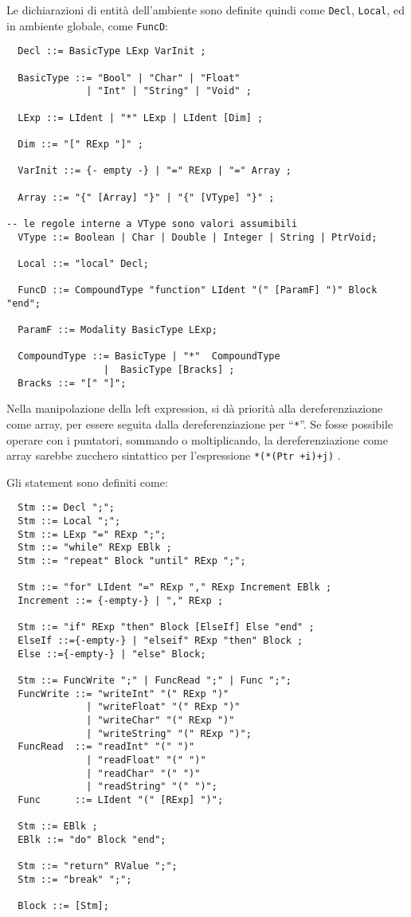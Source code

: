 \documentclass{article}
\begin{document}
Le dichiarazioni di entità dell'ambiente sono definite quindi come \texttt{Decl}, \texttt{Local}, ed in ambiente globale,
come \texttt{FuncD}:
\begin{verbatim}
  Decl ::= BasicType LExp VarInit ;

  BasicType ::= "Bool" | "Char" | "Float" 
              | "Int" | "String" | "Void" ;
  
  LExp ::= LIdent | "*" LExp | LIdent [Dim] ;

  Dim ::= "[" RExp "]" ;

  VarInit ::= {- empty -} | "=" RExp | "=" Array ;

  Array ::= "{" [Array] "}" | "{" [VType] "}" ;

-- le regole interne a VType sono valori assumibili
  VType ::= Boolean | Char | Double | Integer | String | PtrVoid;
  
  Local ::= "local" Decl;
  
  FuncD ::= CompoundType "function" LIdent "(" [ParamF] ")" Block "end";

  ParamF ::= Modality BasicType LExp;

  CompoundType ::= BasicType | "*"  CompoundType 
                 |  BasicType [Bracks] ;
  Bracks ::= "[" "]";
\end{verbatim}
Nella manipolazione della left expression, si dà priorità alla dereferenziazione come array, per essere
seguita dalla dereferenziazione per ``\texttt{*}''. Se fosse possibile operare con i puntatori, sommando
o moltiplicando, la dereferenziazione come array sarebbe zucchero sintattico per l'espressione \texttt{*(*(Ptr +i)+j)} .

Gli statement sono definiti come:
\begin{verbatim}
  Stm ::= Decl ";";
  Stm ::= Local ";";
  Stm ::= LExp "=" RExp ";";
  Stm ::= "while" RExp EBlk ;
  Stm ::= "repeat" Block "until" RExp ";";
  
  Stm ::= "for" LIdent "=" RExp "," RExp Increment EBlk ;
  Increment ::= {-empty-} | "," RExp ;
  
  Stm ::= "if" RExp "then" Block [ElseIf] Else "end" ;
  ElseIf ::={-empty-} | "elseif" RExp "then" Block ;
  Else ::={-empty-} | "else" Block;
  
  Stm ::= FuncWrite ";" | FuncRead ";" | Func ";";
  FuncWrite ::= "writeInt" "(" RExp ")"
              | "writeFloat" "(" RExp ")"
              | "writeChar" "(" RExp ")"
              | "writeString" "(" RExp ")";
  FuncRead  ::= "readInt" "(" ")"
              | "readFloat" "(" ")"
              | "readChar" "(" ")"
              | "readString" "(" ")";
  Func      ::= LIdent "(" [RExp] ")";
  
  Stm ::= EBlk ;
  EBlk ::= "do" Block "end";
  
  Stm ::= "return" RValue ";";
  Stm ::= "break" ";";
  
  Block ::= [Stm];
  
  
\end{verbatim}
\end{document}
